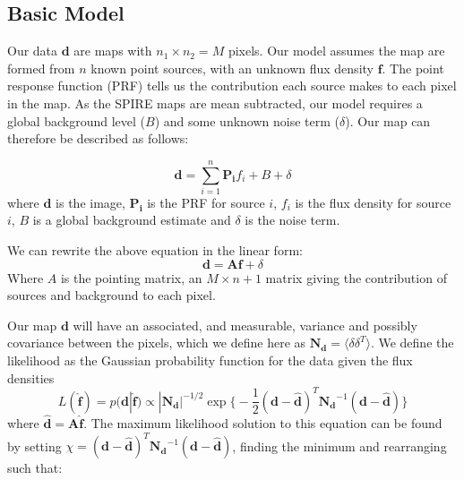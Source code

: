 \documentclass[useAMS,usenatbib]{mn2e}
\begin{document}

\subsection{Basic Model}
Our data $\mathbf{d}$ are maps with $n_1 \times n_2 = M$ pixels. Our model assumes the map are formed from $n$ known point sources, with an unknown flux density $\mathbf{f}$. The point response function (PRF) tells us the contribution each source makes to each pixel in the map. As the SPIRE maps are mean subtracted, our model requires a global background level ($B$) and some unknown noise term ($\delta$). Our map can therefore be described as follows:

\begin{equation}
\mathbf{d} = \sum\limits_{i=1}^n \mathbf{P_i}f_i + B + \delta
\label{eq:map}
\end{equation}
where $\mathbf{d}$ is the image, $\mathbf{P_i}$ is the PRF for source $i$, $f_i$ is the flux density for source $i$, $B$ is a global background estimate and $\delta$ is the noise term.

We can rewrite the above equation in the linear form:
\begin{equation}
\mathbf{d} = \mathbf{Af} + \delta
\label{eq:map2}
\end{equation}
Where $A$ is the pointing matrix, an $M \times n+1$ matrix giving the contribution of sources and background to each pixel.

Our map $\mathbf{d}$ will have an associated, and measurable, variance and possibly covariance between the pixels, which we define here as $\mathbf{N_d} = \langle\delta\delta^T\rangle$. We define the likelihood as the Gaussian probability function for the data given the flux densities
\begin{equation}
L(\hat{\mathbf{f}}) = p(\mathbf{d}|\hat{\mathbf{f}}) \propto |\mathbf{N_d}|^{-1/2} \exp\big\{ -\frac{1}{2}(\mathbf{d}-\hat{\mathbf{d}})^T\mathbf{N_d}^{-1}(\mathbf{d}-\hat{\mathbf{d}})\big\}\label{eq:likelihood}
\end{equation}
where $\hat{\mathbf{d}}=\mathbf{A\hat{f}}$. The maximum likelihood solution to this equation can be found by setting $\chi = (\mathbf{d}-\hat{\mathbf{d}})^T\mathbf{N_d}^{-1}(\mathbf{d}-\hat{\mathbf{d}})$, finding the minimum and rearranging such that:
\end{document}
